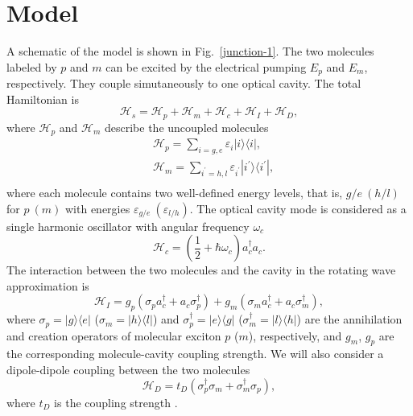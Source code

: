 \documentclass[aps,prb,
superscriptaddress,
,twocolumn
,floatfix,footinbib,longbibliography,
]{revtex4-2}
\begin{document}
\section{Model}
A schematic of the model is shown in Fig.~\ref{junction-1}.
The two molecules labeled by $p$ and $m$ can be excited by the electrical pumping $E_{p}$ and $E_{m}$, respectively.
They couple simutaneously to one optical cavity.
The total Hamiltonian is
\begin{equation}
\mathcal{H}_{s}=\mathcal{H}_{p}+\mathcal{H}_{m}+\mathcal{H}_{c}+\mathcal{H}_{I}+\mathcal{H}_{D},
\label{Hamiltonian}
\end{equation}
where $\mathcal{H}_{p}$ and $\mathcal{H}_{m}$ describe the uncoupled molecules
\begin{equation}
\begin{split}
&\mathcal{H}_{p}=\sum_{i=g,e}\varepsilon_{i}|i\rangle\langle i|,\\
&\mathcal{H}_{m}=\sum_{i^{\prime}=h,l}\varepsilon_{i^{\prime}}|i^{\prime}\rangle\langle i^{\prime}|,\\
\end{split}
\end{equation}
where each molecule contains two well-defined energy levels, that is, $g/e~(h/l)$ for $p~(m)$ with energies $\varepsilon_{g/e}~(\varepsilon_{l/h})$.
The optical cavity mode is considered as  a single harmonic oscillator with angular frequency $\omega_{c}$
\begin{equation}
\mathcal{H}_{c}=\left(\frac{1}{2}+\hbar\omega_{c}\right)a^{\dag}_{c}a_{c}.
\end{equation}
The interaction between the two molecules and the cavity in the rotating wave approximation is
\begin{equation}
\mathcal{H}_{I}=g_{p}(\sigma_{p}a^{\dag}_{c}+a_{c}\sigma_{p}^{\dag})+g_{m}(\sigma_{m}a^{\dag}_{c}+a_{c}\sigma_{m}^{\dag}),
\end{equation}
where $\sigma_{p}=|g\rangle\langle e|$ ($\sigma_{m}=|h\rangle\langle l|$) and $\sigma_{p}^{\dag}=|e\rangle\langle g|$ ($\sigma_{m}^{\dag}=|l\rangle\langle h|$) are the annihilation and creation operators of molecular exciton $p$ ($m$), respectively, and $g_{m}$, $g_{p}$ are the corresponding molecule-cavity coupling strength.
We will also consider a dipole-dipole coupling between the two molecules
\begin{equation}
\mathcal{H}_{D}=t_{D}(\sigma_{p}^{\dagger}\sigma_{m}+\sigma_{m}^{\dagger}\sigma_{p}),
\end{equation}
where $t_{D}$ is the coupling strength \cite{vlaming2014tunable,zhang2016visualizing,PhysRevLett.122.233901}.
\end{document}
